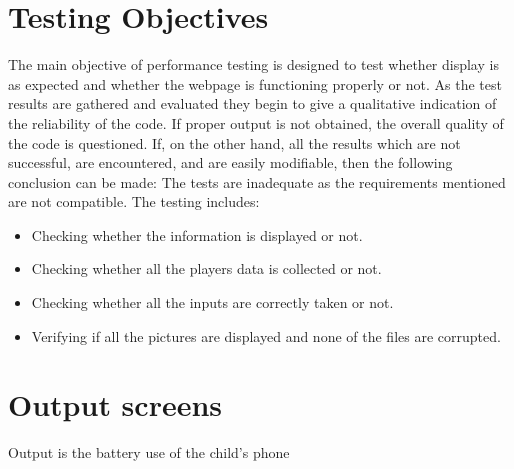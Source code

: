 \section{Testing Objectives}
The main objective of performance testing is designed to test whether display is as expected and whether the webpage is functioning properly or not. 
As the test results are gathered and evaluated they begin to give a qualitative indication of the reliability of the code. If proper output is not obtained, the overall quality of the code is questioned. If, on the other hand, all the results which are not successful, are encountered, and are easily modifiable, then the following conclusion can be made: The tests are inadequate as the requirements mentioned are not compatible. The testing includes:
\begin{itemize}
	\item Checking whether the information is displayed or not.
	\item Checking whether all the players data is collected or not.
	\item Checking whether all the inputs are correctly taken or not.
	\item Verifying if all the pictures are displayed and none of the files are corrupted. 
\end{itemize}
\newpage

\section{Output screens}
Output is the battery use of the child's phone

